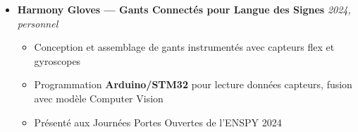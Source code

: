 \documentclass[a4paper,11pt]{article}
\begin{document}
\begin{itemize}[leftmargin=*, label={}]
    \item \textbf{Harmony Gloves — Gants Connectés pour Langue des Signes} \hfill \textit{2024, personnel}
    \vspace{-2pt}
    \begin{itemize}[leftmargin=0.4cm, nosep, label=\tiny$\bullet$]
        \item \small{Conception et assemblage de gants instrumentés avec capteurs flex et gyroscopes}
        \item \small{Programmation \textbf{Arduino/STM32} pour lecture données capteurs, fusion avec modèle Computer Vision}
        \item \small{Présenté aux Journées Portes Ouvertes de l'ENSPY 2024}
    \end{itemize}

\end{itemize}

\end{document}
